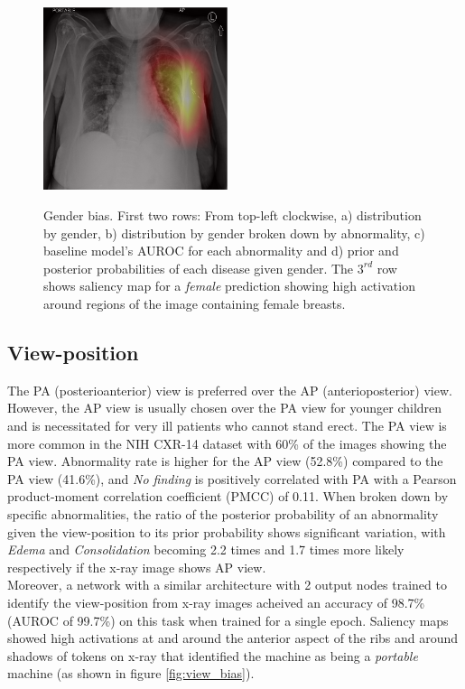 \documentclass[12pt,oneside,a4paper]{report}
\begin{document}
\begin{figure}[H]
  \includegraphics[width=0.48\textwidth]{images/gender_cropped}\\[0.01\textwidth]
  \caption{Gender bias. First two rows: From top-left clockwise, a) distribution by gender, b) distribution by gender broken down by abnormality, c) baseline model's AUROC for each abnormality and d) prior and posterior probabilities of each disease given gender. The $3^{rd}$ row shows saliency map for a \emph{female} prediction showing high activation around regions of the image containing female breasts.}
  \label{fig:gender_bias}
\end{figure}



\subsection{View-position}
The PA (posterioanterior) view is preferred over the AP (anterioposterior) view. However, the AP view is usually chosen over the PA view for younger children and is necessitated for very ill patients who cannot stand erect. The PA view is more common in the NIH CXR-14 dataset with 60\% of the images showing the PA view. Abnormality rate is higher for the AP view (52.8\%) compared to the PA view (41.6\%), and \emph{No finding} is positively correlated with PA with a Pearson product-moment correlation coefficient (PMCC) of 0.11. When broken down by specific abnormalities, the ratio of the posterior probability of an abnormality given the view-position to its prior probability shows significant variation, with \emph{Edema} and \emph{Consolidation} becoming 2.2 times and 1.7 times more likely respectively if the x-ray image shows AP view.\\

Moreover, a network with a similar architecture with 2 output nodes trained to identify the view-position from x-ray images acheived an accuracy of 98.7\% (AUROC of 99.7\%) on this task when trained for a single epoch. Saliency maps showed high activations at and around the anterior aspect of the ribs and around shadows of tokens on x-ray that identified the machine as being a \emph{portable} machine (as shown in figure \ref{fig:view_bias}).\\
\end{document}
